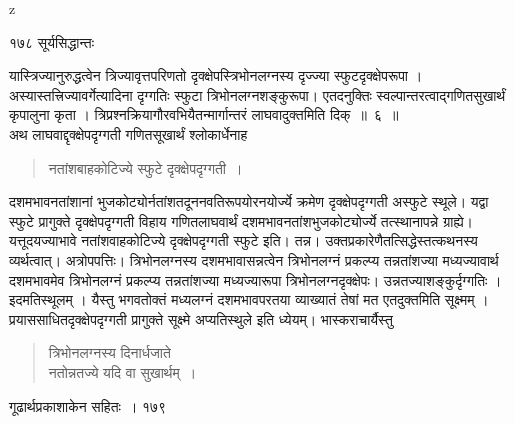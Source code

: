 \documentclass[11pt, openany]{book}
\begin{document}
{\tiny{z}}


\newpage



\noindent १७८ \hspace{4cm} सूर्यसिद्धान्तः
\vspace{1cm}

\begin{sloppypar}
\noindent यास्त्रिज्यानुरुद्धत्वेन त्रिज्यावृत्तपरिणतो दृक्क्षेपस्त्रिभोनलग्नस्य दृज्ज्या स्फुटदृक्क्षेपरूपा । अस्यास्तत्त्रिज्यावर्गेत्यादिना दृग्गतिः स्फुटा त्रिभोनलग्नशङ्कुरूपा। एतदनुक्तिः स्वल्पान्तरत्वाद्गणितसुखार्थं कृपालुना कृता । त्रिप्रश्नक्रियागौरवभियैतन्मार्गान्तरं लाघवादुक्तमिति दिक्~॥~६~॥\\
\noindent अथ लाघवाद्दृक्क्षेपदृग्गती गणितसूखार्थं श्लोकार्धेनाह\textendash
\end{sloppypar}


\begin{quote}
 {\ssi नतांशबाहकोटिज्ये स्फुटे दृक्क्षेपदृग्गती~।}
 \end{quote}


\begin{sloppypar}
दशमभावनतांशानां भुजकोट्योर्नतांशतदूननवतिरूपयोरनयोर्ज्ये क्रमेण दृक्क्षेपदृग्गती अस्फुटे स्थूले। यद्वा स्फुटे प्रागुक्ते दृक्क्षेपदृग्गती विहाय गणितलाघवार्थं दशमभावनतांशभुजकोट्योर्ज्ये तत्स्थानापन्ने ग्राह्ये। यत्तूदयज्याभावे नतांशवाहकोटिज्ये दृक्क्षेपदृग्गती स्फुटे इति। तन्न। उक्तप्रकारेणैतत्सिद्धेस्तत्कथनस्य व्यर्थत्वात्। अत्रोपपत्तिः। त्रिभोनलग्नस्य दशमभावासन्नत्वेन त्रिभोनलग्नं प्रकल्प्य तन्नतांशज्या मध्यज्यावार्थ दशमभावमेव त्रिभोनलग्नं प्रकल्प्य तन्नतांशज्या मध्यज्यारूपा त्रिभोनलग्नदृक्क्षेपः। उन्नतज्याशङ्कुर्दृग्गतिः । इदमतिस्थूलम् । यैस्तु भगवतोक्तं मध्यलग्नं दशमभावपरतया व्याख्यातं तेषां मत एतदुक्तमिति सूक्ष्मम् । प्रयाससाधितदृक्क्षेपदृग्गती प्रागुक्ते सूक्ष्मे अप्यतिस्थुले इति ध्येयम्। भास्कराचार्यैस्तु\textendash
\end{sloppypar}


\begin{quote}
 {\qt त्रिभोनलग्नस्य दिनार्धजाते\\
 नतोन्नतज्ये यदि वा सुखार्थम्~।}
\end{quote}

\newpage


\hspace{3cm}  गूढार्थप्रकाशाकेन सहितः~। \hfill १७९
\vspace{1cm}
\end{document}
